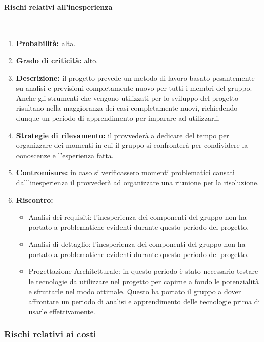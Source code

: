 \paragraph{Rischi relativi all'inesperienza}\mbox{}\\
\begin{enumerate}
	\item \textbf{Probabilità:} alta.
	\item \textbf{Grado di criticità:} alto.
	\item \textbf{Descrizione:} il progetto prevede un metodo di lavoro basato pesantemente su analisi e previsioni completamente nuovo per tutti i membri del gruppo. Anche gli strumenti che vengono utilizzati per lo sviluppo del progetto risultano nella maggioranza dei casi completamente nuovi, richiedendo dunque un periodo di apprendimento per imparare ad utilizzarli.
	\item \textbf{Strategie di rilevamento:} il \Responsabile{} provvederà a dedicare del tempo per organizzare dei momenti in cui il gruppo si confronterà per condividere la conoscenze e l'esperienza fatta.
	\item \textbf{Contromisure:} in caso si verificassero momenti problematici causati dall'inesperienza il \Responsabile{} provvederà ad organizzare una riunione per la risoluzione.
	\item \textbf{Riscontro:}
	\begin{itemize}
	\item Analisi dei requisiti: l'inesperienza dei componenti del gruppo non ha portato a problematiche evidenti durante questo periodo del progetto.
	\item Analisi di dettaglio: l'inesperienza dei componenti del gruppo non ha portato a problematiche evidenti durante questo periodo del progetto.
	\item Progettazione Architetturale: in questo periodo è stato necessario testare le tecnologie da utilizzare nel progetto per capirne a fondo le potenzialità e sfruttarle nel modo ottimale. Questo ha portato il gruppo a dover affrontare un periodo di analisi e apprendimento delle tecnologie prima di usarle effettivamente.
	\end{itemize}
\end{enumerate}

\subsubsection{Rischi relativi ai costi}
